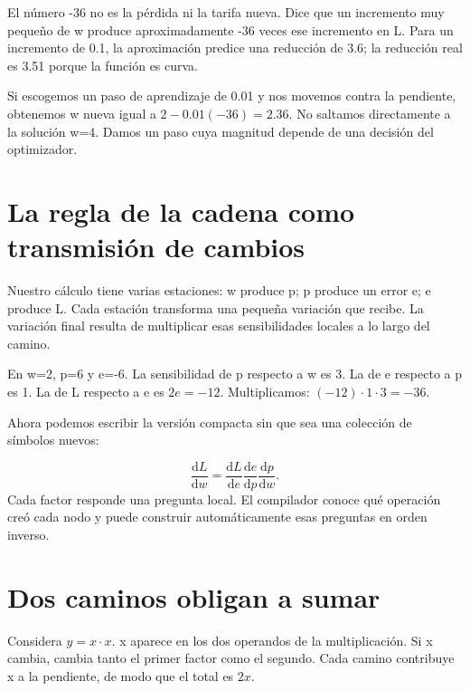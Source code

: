 \documentclass[12pt,a4paper,oneside]{report}
\newcommand{\dd}{\mathrm{d}}
\begin{document}
El número -36 no es la pérdida ni la tarifa nueva. Dice que un incremento muy pequeño de w produce aproximadamente -36 veces ese incremento en L. Para un incremento de 0.1, la aproximación predice una reducción de 3.6; la reducción real es 3.51 porque la función es curva.

Si escogemos un paso de aprendizaje de 0.01 y nos movemos contra la pendiente, obtenemos w nueva igual a $2-0.01(-36)=2.36$. No saltamos directamente a la solución w=4. Damos un paso cuya magnitud depende de una decisión del optimizador.

\section{La regla de la cadena como transmisión de cambios}
Nuestro cálculo tiene varias estaciones: w produce p; p produce un error e; e produce L. Cada estación transforma una pequeña variación que recibe. La variación final resulta de multiplicar esas sensibilidades locales a lo largo del camino.

\begin{center}
\end{center}
En w=2, p=6 y e=-6. La sensibilidad de p respecto a w es 3. La de e respecto a p es 1. La de L respecto a e es $2e=-12$. Multiplicamos: $(-12)\cdot1\cdot3=-36$.

Ahora podemos escribir la versión compacta sin que sea una colección de símbolos nuevos:

\[
\frac{\dd L}{\dd w}=\frac{\dd L}{\dd e}\frac{\dd e}{\dd p}\frac{\dd p}{\dd w}.
\]
Cada factor responde una pregunta local. El compilador conoce qué operación creó cada nodo y puede construir automáticamente esas preguntas en orden inverso.

\section{Dos caminos obligan a sumar}
Considera $y=x\cdot x$. x aparece en los dos operandos de la multiplicación. Si x cambia, cambia tanto el primer factor como el segundo. Cada camino contribuye x a la pendiente, de modo que el total es $2x$.
\end{document}
